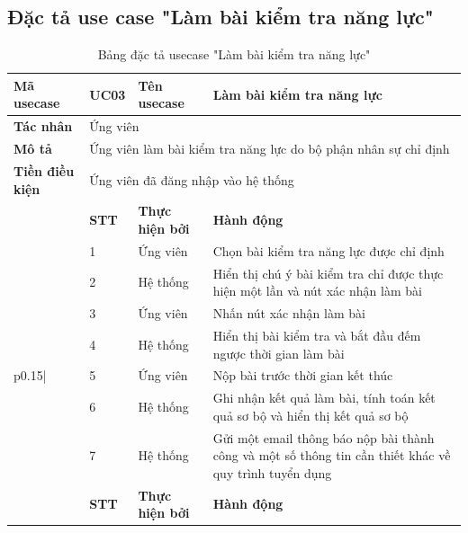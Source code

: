 \documentclass[../DoAn.tex]{subfiles}
\begin{document}
\subsection{Đặc tả use case "Làm bài kiểm tra năng lực"}
\begin{longtable}{|p{}|p{}p{}p{}|}
\caption{Bảng đặc tả usecase "Làm bài kiểm tra năng lực"}
\hline
\textbf{Mã usecase} & \multicolumn{1}{p{0.1\textwidth}|}{UC03} & \multicolumn{1}{p{0.23\textwidth}|}{\textbf{Tên usecase}} & Làm bài kiểm tra năng lực \\ \hline
\textbf{Tác nhân} & \multicolumn{3}{p{0.73\textwidth}|}{Ứng viên} \\ \hline
\textbf{Mô tả} & \multicolumn{3}{p{0.73\textwidth}|}{Ứng viên làm bài kiểm tra năng lực do bộ phận nhân sự chỉ định} \\ \hline
\textbf{Tiền điều kiện} & \multicolumn{3}{p{0.73\textwidth}|}{Ứng viên đã đăng nhập vào hệ thống} \\ \hline
& \multicolumn{1}{l|}{\textbf{STT}} & \multicolumn{1}{l|}{\textbf{Thực hiện bởi}} & \textbf{Hành động} \\ \cline{2-4} 
& \multicolumn{1}{l|}{1} & \multicolumn{1}{l|}{Ứng viên} & Chọn bài kiểm tra năng lực được chỉ định \\ \cline{2-4} 
& \multicolumn{1}{l|}{2} & \multicolumn{1}{l|}{Hệ thống} & Hiển thị chú ý bài kiểm tra chỉ được thực hiện một lần và nút xác nhận làm bài \\ \cline{2-4} 
& \multicolumn{1}{l|}{3} & \multicolumn{1}{l|}{Ứng viên} & Nhấn nút xác nhận làm bài \\ \cline{2-4} 
& \multicolumn{1}{l|}{4} & \multicolumn{1}{l|}{Hệ thống} & Hiển thị bài kiểm tra và bắt đầu đếm ngược thời gian làm bài \\ \cline{2-4} \hline
\multirow{-2}{\multicolumn{1}{p{0.15\textwidth}|}{\textbf{Luồng sự kiện chính}}}       
& \multicolumn{1}{l|}{5} & \multicolumn{1}{l|}{Ứng viên} & Nộp bài trước thời gian kết thúc \\ \cline{2-4}
& \multicolumn{1}{l|}{6} & \multicolumn{1}{l|}{Hệ thống} & Ghi nhận kết quả làm bài, tính toán kết quả sơ bộ và hiển thị kết quả sơ bộ \\ \cline{2-4}
& \multicolumn{1}{l|}{7} & \multicolumn{1}{l|}{Hệ thống} & Gửi một email thông báo nộp bài thành công và một số thông tin cần thiết khác về quy trình tuyển dụng \\ \hline
& \multicolumn{1}{l|}{\textbf{STT}} & \multicolumn{1}{l|}{\textbf{Thực hiện bởi}} & \textbf{Hành động} \\ \cline{2-4}   

\end{longtable}
\end{document}

